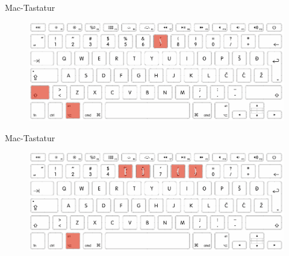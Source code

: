 \documentclass["WS\space 16-17\space -\space LaTeX-Kurs\space -\space Praesentation\space -\space 1.tex"]{subfiles}
\begin{document}
\begin{frame}[c]{Mac-Tastatur}
	\begin{figure}[htbp]
\centering
\includegraphics[width=1.0\textwidth]{img/tastatur/tastatur_mac_shift.png}
\end{figure}
\end{frame}


\begin{frame}[c]{Mac-Tastatur}
	\begin{figure}[htbp]
\centering
\includegraphics[width=1.0\textwidth]{img/tastatur/tastatur_mac_alt.png}
\end{figure}
\end{frame}
\end{document}
